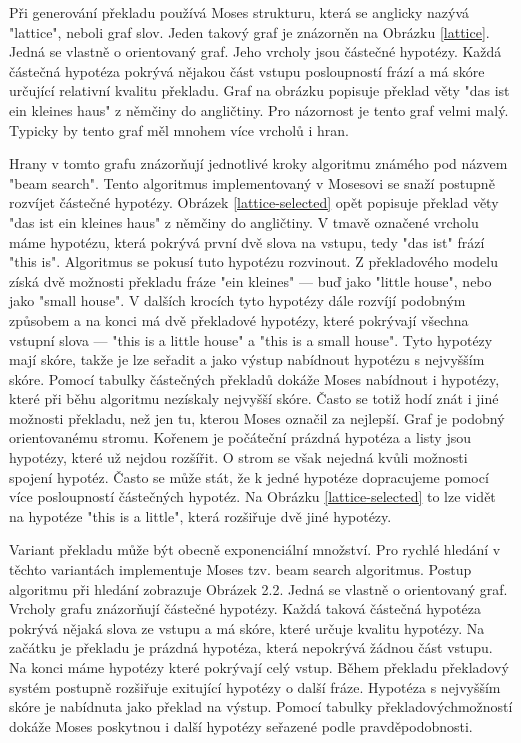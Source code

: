 \documentclass[12pt,a4paper]{report}
\begin{document}
Při generování překladu používá Moses strukturu, která se anglicky nazývá "lattice", neboli graf slov. Jeden takový graf je znázorněn na Obrázku \ref{lattice}. Jedná se vlastně o orientovaný graf. Jeho vrcholy jsou částečné hypotézy. Každá částečná hypotéza pokrývá nějakou část vstupu posloupností frází a má skóre určující relativní kvalitu překladu. Graf na obrázku popisuje překlad věty "das ist ein kleines haus" z němčiny do angličtiny. Pro názornost je tento graf velmi malý. Typicky by tento graf měl mnohem více vrcholů i hran.

Hrany v tomto grafu znázorňují jednotlivé kroky algoritmu známého pod názvem "beam search". Tento algoritmus implementovaný v Mosesovi se snaží postupně rozvíjet částečné hypotézy. Obrázek \ref{lattice-selected} opět popisuje překlad věty "das ist ein kleines haus" z němčiny do angličtiny. V tmavě označené vrcholu máme hypotézu, která pokrývá první dvě slova na vstupu, tedy "das ist" frází "this is". Algoritmus se pokusí tuto hypotézu rozvinout. Z překladového modelu získá dvě možnosti překladu fráze "ein kleines" --- buď jako "little house", nebo jako "small house". V dalších krocích tyto hypotézy dále rozvíjí podobným způsobem a na konci má dvě překladové hypotézy, které pokrývají všechna vstupní slova --- "this is a little house" a "this is a small house". Tyto hypotézy mají skóre, takže je lze seřadit a jako výstup nabídnout hypotézu s nejvyšším skóre. Pomocí tabulky částečných překladů dokáže Moses nabídnout i hypotézy, které při běhu algoritmu nezískaly nejvyšší skóre. Často se totiž hodí znát i jiné možnosti překladu, než jen tu, kterou Moses označil za nejlepší. Graf je podobný orientovanému stromu. Kořenem je počáteční prázdná hypotéza a listy jsou hypotézy, které už nejdou rozšířit. O strom se však nejedná kvůli možnosti spojení hypotéz. Často se může stát, že k jedné hypotéze dopracujeme pomocí více posloupností částečných hypotéz. Na Obrázku \ref{lattice-selected} to lze vidět na hypotéze "this is a little", která rozšiřuje dvě jiné hypotézy.

Variant překladu může být obecně exponenciální množství. Pro rychlé hledání v těchto variantách implementuje Moses tzv. beam search algoritmus. Postup algoritmu při hledání zobrazuje Obrázek 2.2. Jedná se vlastně o orientovaný graf. Vrcholy grafu znázorňují částečné hypotézy. Každá taková částečná hypotéza pokrývá nějaká slova ze vstupu a má skóre, které určuje kvalitu hypotézy. Na začátku je překladu je prázdná hypotéza, která nepokrývá žádnou část vstupu. Na konci máme hypotézy které pokrývají celý vstup. Během překladu překladový systém postupně rozšiřuje exitující hypotézy o další fráze. Hypotéza s nejvyšším skóre je nabídnuta jako překlad na výstup. Pomocí tabulky překladovýchmožností dokáže Moses poskytnou i další hypotézy seřazené podle pravděpodobnosti.
\end{document}
